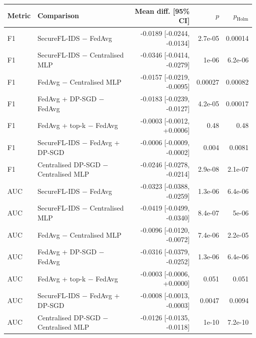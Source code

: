 \begin{tabular}{llrrr}
\toprule
Metric & Comparison & Mean diff. [95\% CI] & $p$ & $p_{\mathrm{Holm}}$ \\
\midrule
F1 & SecureFL-IDS $-$ FedAvg & -0.0189 [-0.0244, -0.0134] & 2.7e-05 & 0.00014 \\
F1 & SecureFL-IDS $-$ Centralised MLP & -0.0346 [-0.0414, -0.0279] & 1e-06 & 6.2e-06 \\
F1 & FedAvg $-$ Centralised MLP & -0.0157 [-0.0219, -0.0095] & 0.00027 & 0.00082 \\
F1 & FedAvg + DP-SGD $-$ FedAvg & -0.0183 [-0.0239, -0.0127] & 4.2e-05 & 0.00017 \\
F1 & FedAvg + top-k $-$ FedAvg & -0.0003 [-0.0012, +0.0006] & 0.48 & 0.48 \\
F1 & SecureFL-IDS $-$ FedAvg + DP-SGD & -0.0006 [-0.0009, -0.0002] & 0.004 & 0.0081 \\
F1 & Centralised DP-SGD $-$ Centralised MLP & -0.0246 [-0.0278, -0.0214] & 2.9e-08 & 2.1e-07 \\
AUC & SecureFL-IDS $-$ FedAvg & -0.0323 [-0.0388, -0.0259] & 1.3e-06 & 6.4e-06 \\
AUC & SecureFL-IDS $-$ Centralised MLP & -0.0419 [-0.0499, -0.0340] & 8.4e-07 & 5e-06 \\
AUC & FedAvg $-$ Centralised MLP & -0.0096 [-0.0120, -0.0072] & 7.4e-06 & 2.2e-05 \\
AUC & FedAvg + DP-SGD $-$ FedAvg & -0.0316 [-0.0379, -0.0252] & 1.3e-06 & 6.4e-06 \\
AUC & FedAvg + top-k $-$ FedAvg & -0.0003 [-0.0006, +0.0000] & 0.051 & 0.051 \\
AUC & SecureFL-IDS $-$ FedAvg + DP-SGD & -0.0008 [-0.0013, -0.0003] & 0.0047 & 0.0094 \\
AUC & Centralised DP-SGD $-$ Centralised MLP & -0.0126 [-0.0135, -0.0118] & 1e-10 & 7.2e-10 \\
\bottomrule
\end{tabular}

